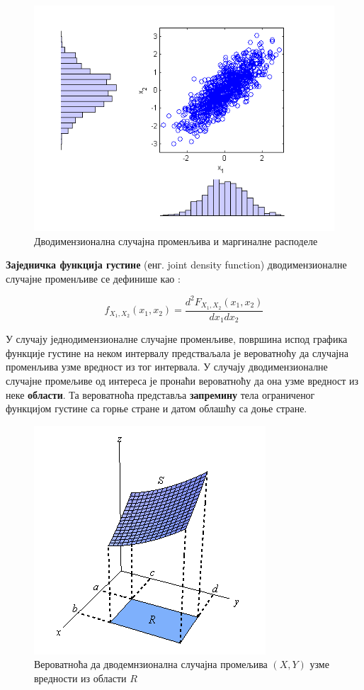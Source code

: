 \begin{figure}[H]
    \centering
\captionsetup{justification=centering}
   \includegraphics[scale=0.8]{./Slike/slika19.png} 
	\caption{Дводимензионална случајна променљива и маргиналне расподеле} 
	\label{fig:slika13}
\end{figure}


\textbf{Заједничка функција густине} (енг. joint density function) дводимензионалне случајне променљиве се дефинише као :

\begin{equation}
f_{X_1,X_2}(x_1,x_2) = \frac{d^2 F_{X_1,X_2}(x_1,x_2)}{dx_1dx_2}
\end{equation}

У случају једнодимензионалне случајне променљиве, површина испод графика функције густине на неком интервалу предстваљала је вероватноћу да случајна променљива узме вредност из тог интервала. У случају дводимензионалне случајне промељиве од интереса је пронаћи вероватноћу да она узме вредност из неке \textbf{области}. Та вероватноћа представља \textbf{запремину} тела ограниченог функцијом густине са горње стране и датом облашћу са доње стране.

\begin{figure}[H]
    \centering
\captionsetup{justification=centering}
   \includegraphics[scale=0.8]{./Slike/slika18.png} 
	\caption{Вероватноћа да дводемнзионална случајна промељива $(X,Y)$ узме вредности из области $R$} 
	\label{fig:slika18}
\end{figure}

